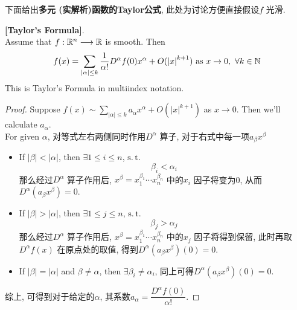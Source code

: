 	下面给出\textbf{多元 (实解析)函数的Taylor公式}, 此处为讨论方便直接假设$f$ 光滑.
	\begin{thm}\label{thm 1.4.1}
		\textbf{[Taylor's Formula]}. \\
		Assume that $f : \mathbb{R}^n \longrightarrow \mathbb{R}$ is smooth. Then
		\begin{align}
			f(x) 
			= \sum_{\left| \alpha \right| \leq k} \frac{1}{\alpha !} D^{\alpha}f(0) x^{\alpha} + O(\left| x \right|^{k + 1}) 
			\,\, \text{as} \,\, x \to 0 , \,\, \forall k \in \mathbb{N}
		\end{align}
		This is Taylor's Formula in multiindex notation.
		
		\vspace{6em}
		
		\begin{proof}
			Suppose $f(x) \sim \sum\limits_{\left| \alpha \right| \leq k} a_\alpha x^{\alpha} + O(\left| x \right|^{k + 1})$ as $x \to 0$. Then we'll calculate $a_\alpha$. \\
			For given $\alpha$, 对等式左右两侧同时作用$D^{\alpha}$ 算子, 对于右式中每一项$a_\beta x^{\beta}$
			\begin{itemize}
				\item If $\left| \beta \right| < \left| \alpha \right|$, then $\exists 1 \leq i \leq n$, $\operatorname{s.t.}$
				\[ \beta_i < \alpha_i \]
				那么经过$D^{\alpha}$ 算子作用后, $x^{\beta} = x_{1}^{\beta_1} \cdots x_{n}^{\beta_n}$ 中的$x_i$ 因子将变为0, 从而$D^{\alpha} (a_{\beta}x^{\beta}) = 0$.
				
				\vspace{2em}
				
				\item If $\left| \beta \right| > \left| \alpha \right|$, then $\exists 1 \leq j \leq n$, $\operatorname{s.t.}$
				\[ \beta_j > \alpha_j \]
				那么经过$D^{\alpha}$ 算子作用后, $x^{\beta} = x_{1}^{\beta_1} \cdots x_{n}^{\beta_n}$ 中的$x_j$ 因子将得到保留, 此时再取$D^{\alpha}f(x)$ 在原点处的取值, 得到$D^{\alpha}(a_\beta x^{\beta})(0) = 0$.
				
				\vspace{2em}
				
				\item If $\left| \beta \right| = \left| \alpha \right|$ and $\beta \neq \alpha$, then $\exists \beta_i \neq \alpha_i$, 同上可得$D^{\alpha}(a_\beta x^{\beta})(0) = 0$.
			\end{itemize}
			综上, 可得到对于给定的$\alpha$, 其系数$a_{\alpha} = \dfrac{D^{\alpha}f(0)}{\alpha !}$.
		\end{proof}
	\end{thm}

